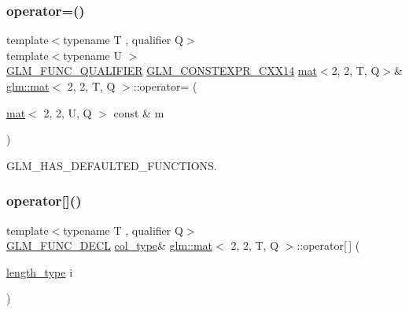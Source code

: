 \subsubsection{\texorpdfstring{operator=()}{operator=()}\hspace{0.1cm}{\footnotesize\ttfamily [3/3]}}
{\footnotesize\ttfamily template$<$typename T , qualifier Q$>$ \\
template$<$typename U $>$ \\
\hyperlink{setup_8hpp_a33fdea6f91c5f834105f7415e2a64407}{G\+L\+M\+\_\+\+F\+U\+N\+C\+\_\+\+Q\+U\+A\+L\+I\+F\+I\+ER} \hyperlink{setup_8hpp_a4dd12abf5e1164bc57f3a34671d03844}{G\+L\+M\+\_\+\+C\+O\+N\+S\+T\+E\+X\+P\+R\+\_\+\+C\+X\+X14} \hyperlink{structglm_1_1mat}{mat}$<$2, 2, T, Q$>$\& \hyperlink{structglm_1_1mat}{glm\+::mat}$<$ 2, 2, T, Q $>$\+::operator= (\begin{DoxyParamCaption}\item[{\hyperlink{structglm_1_1mat}{mat}$<$ 2, 2, U, Q $>$ const \&}]{m }\end{DoxyParamCaption})}



G\+L\+M\+\_\+\+H\+A\+S\+\_\+\+D\+E\+F\+A\+U\+L\+T\+E\+D\+\_\+\+F\+U\+N\+C\+T\+I\+O\+NS. 

\mbox{\label{structglm_1_1mat_3_012_00_012_00_01_t_00_01_q_01_4_a3412817642a709f843240b51f05514a5}} 
\subsubsection{\texorpdfstring{operator[]()}{operator[]()}\hspace{0.1cm}{\footnotesize\ttfamily [1/2]}}
{\footnotesize\ttfamily template$<$typename T , qualifier Q$>$ \\
\hyperlink{setup_8hpp_ab2d052de21a70539923e9bcbf6e83a51}{G\+L\+M\+\_\+\+F\+U\+N\+C\+\_\+\+D\+E\+CL} \hyperlink{structglm_1_1mat_3_012_00_012_00_01_t_00_01_q_01_4_a2983591534ee443dd378cedcbe771749}{col\+\_\+type}\& \hyperlink{structglm_1_1mat}{glm\+::mat}$<$ 2, 2, T, Q $>$\+::operator\mbox{[}$\,$\mbox{]} (\begin{DoxyParamCaption}\item[{\hyperlink{structglm_1_1mat_3_012_00_012_00_01_t_00_01_q_01_4_a96c65b091fc8fe8e6f5637e30c9c1f81}{length\+\_\+type}}]{i }\end{DoxyParamCaption})}

